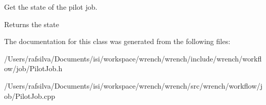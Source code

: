 Get the state of the pilot job. 

\begin{DoxyReturn}{Returns}
the state 
\end{DoxyReturn}


The documentation for this class was generated from the following files\+:\begin{DoxyCompactItemize}
\item 
/\+Users/rafsilva/\+Documents/isi/workspace/wrench/wrench/include/wrench/workflow/job/Pilot\+Job.\+h\item 
/\+Users/rafsilva/\+Documents/isi/workspace/wrench/wrench/src/wrench/workflow/job/Pilot\+Job.\+cpp\end{DoxyCompactItemize}
